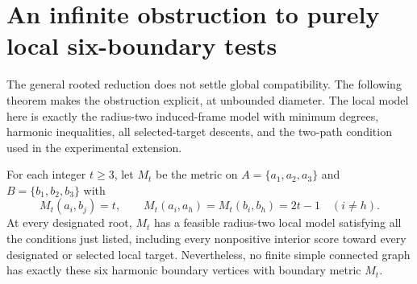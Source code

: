 \section{An infinite obstruction to purely local six-boundary tests}\label{sec:six-local-barrier}
The general rooted reduction does not settle global compatibility. The
following theorem makes the obstruction explicit, at unbounded diameter.
The local model here is exactly the radius-two induced-frame model with
minimum degrees, harmonic inequalities, all selected-target descents, and
the two-path condition used in the experimental extension.

\begin{theorem}
For each integer $t\ge3$, let $M_t$ be the metric on
$A=\{a_1,a_2,a_3\}$ and $B=\{b_1,b_2,b_3\}$ with
\[
 M_t(a_i,b_j)=t,\qquad
 M_t(a_i,a_h)=M_t(b_i,b_h)=2t-1\quad(i\ne h).
\]
At every designated root, $M_t$ has a feasible radius-two local model
satisfying all the conditions just listed, including every nonpositive
interior score toward every designated or selected local target.
Nevertheless, no finite simple connected graph has exactly these six
harmonic boundary vertices with boundary metric $M_t$.
\end{theorem}
